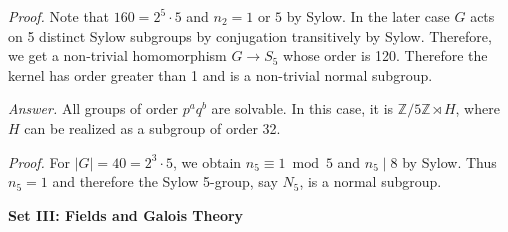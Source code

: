 \documentclass{mathproblems}
\newcommand\Z{\mathbb{Z}}
\begin{document}
\begin{questions}

\textit{Proof.} Note that $160=2^5\cdot 5$ and $n_2=1$ or $5$ by Sylow. In the later case $G$ acts on 5 distinct Sylow subgroups by conjugation transitively by Sylow. Therefore, we get a non-trivial homomorphism $G\to S_5$ whose order is 120. Therefore the kernel has order greater than 1 and is a non-trivial normal subgroup.

\textit{Answer.} All groups of order $p^a q^b$ are solvable. In this case, it is $\Z/5\Z\rtimes H$, where $H$ can be realized as a subgroup of order 32.


\textit{Proof.} For $|G|=40=2^3\cdot 5$, we obtain $n_5\equiv 1\bmod 5$ and $n_5\mid 8$ by Sylow. Thus $n_5=1$ and therefore the Sylow 5-group, say $N_5$, is a normal subgroup.

\end{questions}

\newpage

\centerline{\textbf{Set III: Fields and Galois Theory}}
\end{document}
